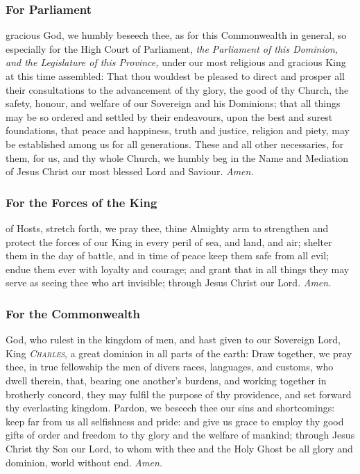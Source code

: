\subsubsection{For Parliament}
 gracious God, we humbly beseech thee, as for this Commonwealth in general, so especially for the High Court of Parliament, \textit{the Parliament of this Dominion, and the Legislature of this Province,} under our most religious and gracious King at this time assembled: That thou wouldest be pleased to direct and prosper all their consultations to the advancement of thy glory, the good of thy Church, the safety, honour, and welfare of our Sovereign and his Dominions; that all things may be so ordered and settled by their endeavours, upon the best and surest foundations, that peace and happiness, truth and justice, religion and piety, may be established among us for all generations. These and all other necessaries, for them, for us, and thy whole Church, we humbly beg in the Name and Mediation of Jesus Christ our most blessed Lord and Saviour. \textit{Amen.}

\subsubsection{For the Forces of the King}
 of Hosts, stretch forth, we pray thee, thine Almighty arm to strengthen and protect the forces of our King in every peril of sea, and land, and air; shelter them in the day of battle, and in time of peace keep them safe from all evil; endue them ever with loyalty and courage; and grant that in all things they may serve as seeing thee who art invisible; through Jesus Christ our Lord. \textit{Amen.}

\subsubsection{For the Commonwealth}
 God, who rulest in the kingdom of men, and hast given to our Sovereign Lord, King \textsc{\textit{Charles}}, a great dominion in all parts of the earth: Draw together, we pray thee, in true fellowship the men of divers races, languages, and customs, who dwell therein, that, bearing one another's burdens, and working together in brotherly concord, they may fulfil the purpose of thy providence, and set forward thy everlasting kingdom. Pardon, we beseech thee our sins and shortcomings: keep far from us all selfishness and pride: and give us grace to employ thy good gifts of order and freedom to thy glory and the welfare of mankind; through Jesus Christ thy Son our Lord, to whom with thee and the Holy Ghost be all glory and dominion, world without end. \textit{Amen.}

